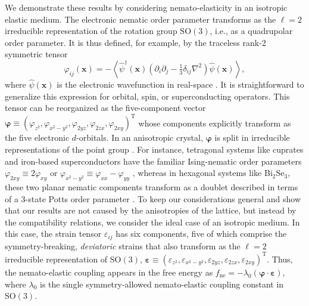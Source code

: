 \documentclass[aps,prb, twocolumn, superscriptaddress, amsmath, amsfonts, amssymb, amsthm]{revtex4-2}
\begin{document}
We demonstrate these results by considering nemato-elasticity in an isotropic elastic medium. The electronic nematic order parameter transforms as the $\ell = 2$ irreducible representation of the rotation group $\text{SO}(3)$, i.e., as a quadrupolar order parameter. It is thus defined, for example, by the traceless rank-2 symmetric tensor
\begin{equation}
    \varphi_{ij}\left(\boldsymbol{x}\right)=-\left\langle \hat{\psi}^{\dagger}\left(\boldsymbol{x}\right)\left(\partial_{i}\partial_{j}-\tfrac{1}{3}\delta_{ij}\nabla^{2}\right)\hat{\psi}\left(\boldsymbol{x}\right)\right\rangle , \label{eq:electronic_nematic_tensor}
\end{equation}
where $\hat{\psi}(\boldsymbol{x})$ is the electronic wavefunction in real-space \citep{Oganesyan01, Fradkin_review, RMF14_classification_nematics}. It is straightforward to generalize this expression for orbital, spin, or superconducting operators. This tensor can be reorganized as the five-component vector
$\boldsymbol{\varphi}\equiv( \varphi_{z^2}, \varphi_{x^2-y^2}, \varphi_{2yz}, \varphi_{2zx}, \varphi_{2xy})^{\text{T}}$ whose components explicitly transform as the five electronic $d$-orbitals. In an anisotropic crystal, $\boldsymbol{\varphi}$ is split in irreducible representations of the point group \citep{RMF14_classification_nematics}. For instance, tetragonal systems like cuprates and iron-based superconductors have the familiar Ising-nematic order parameters $\varphi_{2xy} \equiv 2\varphi_{xy}$  or $\varphi_{x^2-y^2} \equiv \varphi_{xx}-\varphi_{yy}$ \citep{chubukovOriginNematicOrder2015, fernandesIronPnictidesChalcogenides2022,achkarNematicityStripeorderedCuprates2016}, whereas in hexagonal systems like Bi$_2$Se$_3$, these two planar nematic components transform as a doublet described in terms of a 3-state Potts order parameter  \citep{Cho2020_nem, RMF08_Potts_nematic_strain, Hwangbo2024_nem, RMF14_classification_nematics, galiCriticalNematicPhase2024, hattoriOrbitalMoireQuadrupolar2024}. To keep our considerations general and show that our results are not caused by the anisotropies of the lattice, but instead by the compatibility relations, we consider the ideal case of an isotropic medium. In this case, the strain tensor $\varepsilon_{ij}$ has six components, five of which comprise the symmetry-breaking, \textit{deviatoric} strains that also transform as the $\ell = 2$  irreducible representation of $\text{SO}(3)$, $\boldsymbol{\varepsilon}\equiv (\varepsilon_{z^2},\varepsilon_{x^2-y^2},\varepsilon_{2yz},\varepsilon_{2zx},\varepsilon_{2xy})^{\text{T}}$. Thus, the nemato-elastic coupling appears in the free energy as $f_{\text{ne}} = -\lambda_0 (\boldsymbol{\varphi}\cdot \boldsymbol{\varepsilon})$, where $\lambda_0$  is the single symmetry-allowed nemato-elastic coupling constant in $\text{SO}(3)$.
\end{document}
